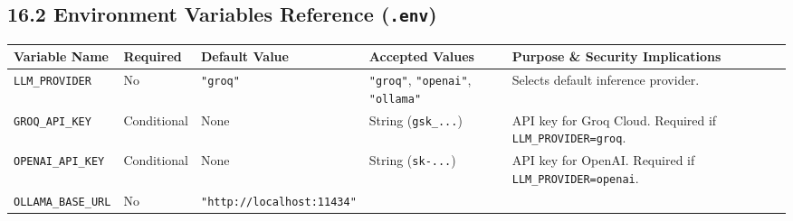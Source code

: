 \documentclass[
]{article}
\begin{document}
\subsection{\texorpdfstring{16.2 Environment Variables Reference
(\texttt{.\allowbreak env})}{16.2 Environment Variables Reference (.env)}}\label{environment-variables-reference-.env}

\begingroup\footnotesize
\begin{longtable}[]{@{}
  >{\raggedright\arraybackslash\sloppy}p{}
  >{\raggedright\arraybackslash\sloppy}p{}
  >{\raggedright\arraybackslash\sloppy}p{}
  >{\raggedright\arraybackslash\sloppy}p{}
  >{\raggedright\arraybackslash\sloppy}p{}@{}}
\toprule\noalign{}
\begin{minipage}[b]{\linewidth}\raggedright
Variable Name
\end{minipage} & \begin{minipage}[b]{\linewidth}\raggedright
Required
\end{minipage} & \begin{minipage}[b]{\linewidth}\raggedright
Default Value
\end{minipage} & \begin{minipage}[b]{\linewidth}\raggedright
Accepted Values
\end{minipage} & \begin{minipage}[b]{\linewidth}\raggedright
Purpose \& Security Implications
\end{minipage} \\
\midrule\noalign{}
\endhead
\bottomrule\noalign{}
\endlastfoot
\texttt{LLM\_\allowbreak PROVIDER} & No & \texttt{"groq"} & \texttt{"groq"},
\texttt{"openai"}, \texttt{"ollama"} & Selects default inference
provider. \\
\texttt{GROQ\_\allowbreak API\_\allowbreak KEY} & Conditional & None & String
(\texttt{gsk\_\allowbreak .\allowbreak .\allowbreak .}) & API key for Groq Cloud. Required if
\texttt{LLM\_\allowbreak PROVIDER=\allowbreak groq}. \\
\texttt{OPENAI\_\allowbreak API\_\allowbreak KEY} & Conditional & None & String
(\texttt{sk-.\allowbreak .\allowbreak .}) & API key for OpenAI. Required if
\texttt{LLM\_\allowbreak PROVIDER=\allowbreak openai}. \\
\texttt{OLLAMA\_\allowbreak BASE\_\allowbreak URL} & No & \texttt{"http:/\allowbreak /\allowbreak localhost:11434"} &

\end{longtable}
\end{document}
